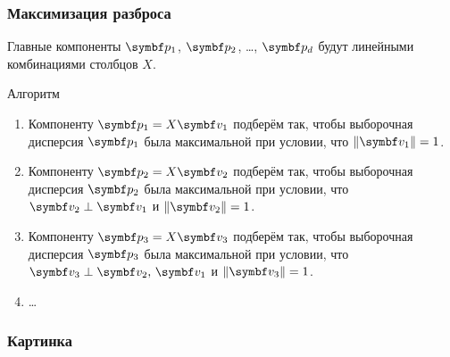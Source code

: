 \begin{frame}
  \frametitle{Максимизация разброса}

  Главные компоненты $\bp_1$, $\bp_2$, \ldots, $\bp_d$ будут линейными 
  комбинациями столбцов $X$. \pause

  \begin{block}{Алгоритм}
    \begin{enumerate}
      \item Компоненту $\bp_1 = X \bv_1$ подберём так, чтобы 
      выборочная дисперсия $\bp_1$ была максимальной при условии, что $\norm{\bv_1}=1$. \pause
    \item Компоненту $\bp_2 = X \bv_2$ подберём так, чтобы 
    выборочная дисперсия $\bp_2$ была максимальной при условии, что $\bv_2 \perp \bv_1$ и $\norm{\bv_2}=1$. \pause
  \item Компоненту $\bp_3 = X \bv_3$ подберём так, чтобы 
  выборочная дисперсия $\bp_3$ была максимальной при условии, что $\bv_3 \perp \bv_2,\, \bv_1$ и $\norm{\bv_3}=1$. 
      \item \ldots
    \end{enumerate}
    
  \end{block}
  

\end{frame}


\begin{frame}
  \frametitle{Картинка}



  

\end{frame}


